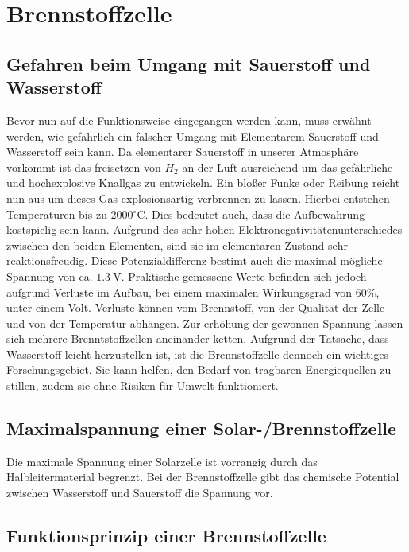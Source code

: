 
\section{Brennstoffzelle}

\subsection*{Gefahren beim Umgang mit Sauerstoff und Wasserstoff}

Bevor nun auf die Funktionsweise eingegangen werden kann, muss erwähnt werden, wie gefährlich ein falscher Umgang mit Elementarem Sauerstoff und Wasserstoff sein kann.
Da elementarer Sauerstoff in unserer Atmosphäre vorkommt ist das freisetzen von $H_2$ an der Luft ausreichend um das gefährliche und hochexplosive Knallgas zu entwickeln. Ein bloßer Funke oder Reibung reicht nun aus um dieses Gas explosionsartig verbrennen zu lassen.
Hierbei entstehen Temperaturen bis zu 2000$^\circ$C.
Dies bedeutet auch, dass die Aufbewahrung kostspielig sein kann.
Aufgrund des sehr hohen Elektronegativitätenunterschiedes zwischen den beiden Elementen, sind sie im elementaren Zustand sehr reaktionsfreudig. Diese Potenzialdifferenz bestimt auch die maximal mögliche Spannung von ca. $\SI{1,3}{\volt}$.
Praktische gemessene Werte befinden sich jedoch aufgrund Verluste im Aufbau, bei einem maximalen Wirkungsgrad von 60\%, unter einem Volt.
Verluste können vom Brennstoff, von der Qualität der Zelle und von der Temperatur abhängen.
Zur erhöhung der gewonnen Spannung lassen sich mehrere Brenntstoffzellen aneinander ketten.
Aufgrund der Tatsache, dass Wasserstoff leicht herzustellen ist, ist die Brennstoffzelle dennoch ein wichtiges Forschungsgebiet.
Sie kann helfen, den Bedarf von tragbaren Energiequellen zu stillen, zudem sie ohne Risiken für Umwelt funktioniert.

\subsection*{Maximalspannung einer Solar-/Brennstoffzelle}
Die maximale Spannung einer Solarzelle ist vorrangig durch das Halbleitermaterial begrenzt. Bei der Brennstoffzelle gibt das chemische Potential zwischen Wasserstoff und Sauerstoff die Spannung vor.

\subsection*{Funktionsprinzip einer Brennstoffzelle}

